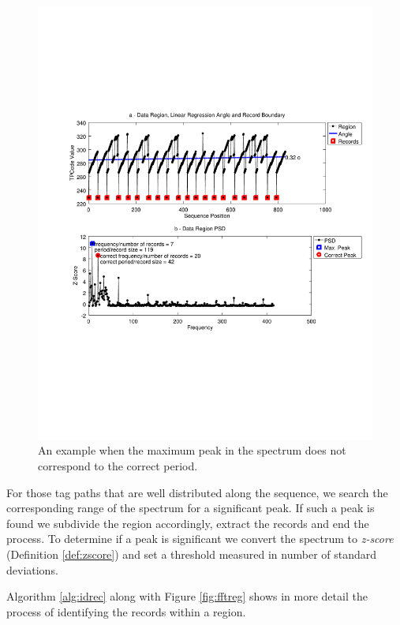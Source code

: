 \vspace{-0.3cm}

\begin{figure}[h]
  \centering
     \includegraphics[trim={2.5cm 7.5cm 1cm 6.5cm}, width=\linewidth
     ]{img/fftleak.pdf}
  \caption{\small{An example when the maximum peak in the spectrum does not correspond to the correct period.}}
  \label{fig:fftleak}
\end{figure}

\vspace{-0.3cm}

For those tag paths that are well distributed along the sequence, we search the
corresponding range of the spectrum for a significant peak. If such a peak is
found we subdivide the region accordingly, extract the records and end the
process. To determine if a peak is significant we convert the spectrum to
\textit{z-score} (Definition \ref{def:zscore}) and set a threshold measured in
number of standard deviations.

Algorithm \ref{alg:idrec} along with Figure \ref{fig:fftreg} shows in more
detail the process of identifying the records within a region.

